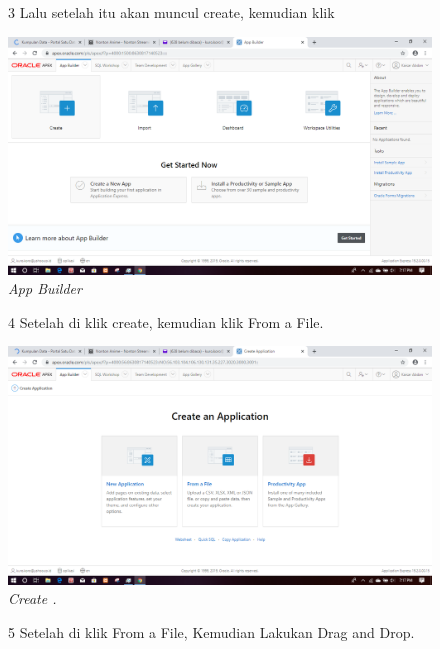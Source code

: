 \begin{enumerate}
\begin{figure}[!htbp]
\item[3] Lalu setelah itu akan muncul create, kemudian klik

    \begin{center}
\includegraphics[scale=0.2]{figures/3.png}
    \caption{\textit{App Builder}}
        \end{center}
\label{gambar}
\end{figure}

\begin{figure}
\item[4] Setelah di klik create, kemudian klik From a File.

    \begin{center}
\includegraphics[scale=0.2]{figures/4.png}
    \caption{\textit{Create .}}
        \end{center}
\label{gambar}
\end{figure}

\begin{figure}
\item[5] Setelah di klik From a File, Kemudian Lakukan Drag and Drop.


\end{figure}
\end{enumerate}
